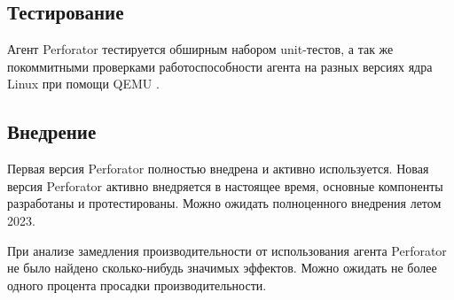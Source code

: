 \subsection{Тестирование}
Агент Perforator тестируется обширным набором unit-тестов, а так же покоммитными проверками работоспособности агента на разных версиях
ядра Linux при помощи QEMU \cite{qemu}.

\subsection{Внедрение}
Первая версия Perforator полностью внедрена и активно используется.
Новая версия Perforator активно внедряется в настоящее время, основные компоненты разработаны и протестированы.
Можно ожидать полноценного внедрения летом 2023.

При анализе замедления производительности от использования агента Perforator не было найдено сколько-нибудь значимых эффектов.
Можно ожидать не более одного процента просадки производительности.
